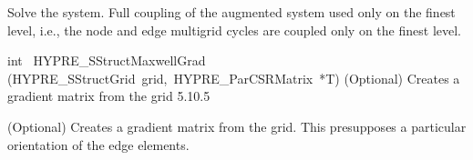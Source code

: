 \documentclass{article}
\begin{document}
\begin{cxxentry}
\begin{cxxentry}
\begin{cxxfunction}
\begin{cxxdoc}
Solve the system. Full coupling of the augmented system used
only on the finest level, i.e., the node and edge multigrid
cycles are coupled only on the finest level.
\end{cxxdoc}
\end{cxxfunction}
\begin{cxxfunction}
{int\ }
        {HYPRE\_SStructMaxwellGrad}
        {(HYPRE\_SStructGrid\ grid,\ HYPRE\_ParCSRMatrix\ *T)}
        {
(Optional) Creates a gradient matrix from the grid}
        {5.10.5}
\begin{cxxdoc}

(Optional) Creates a gradient matrix from the grid. This presupposes
a particular orientation of the edge elements.
\end{cxxdoc}
\end{cxxfunction}
\end{cxxentry}
\end{cxxentry}
\end{document}

